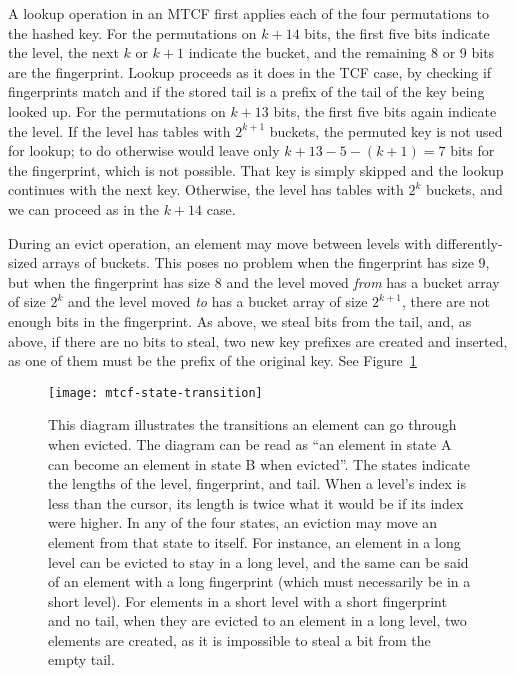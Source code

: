 \documentclass[sigconf, nonacm]{acmart}
\begin{document}
A lookup operation in an MTCF first applies each of the four permutations to the hashed key.
For the permutations on $k + 14$ bits, the first five bits indicate the level, the next $k$ or $k+1$ indicate the bucket, and the remaining 8 or 9 bits are the fingerprint.
Lookup proceeds as it does in the TCF case, by checking if fingerprints match and if the stored tail is a prefix of the tail of the key being looked up.
For the permutations on $k + 13$ bits, the first five bits again indicate the level.
If the level has tables with $2^{k+1}$ buckets, the permuted key is not used for lookup; to do otherwise would leave only $k+13 - 5 - (k+1) = 7$ bits for the fingerprint, which is not possible.
That key is simply skipped and the lookup continues with the next key. %
Otherwise, the level has tables with $2^k$ buckets, and we can proceed as in the $k+14$ case.


During an evict operation, an element may move between levels with differently-sized arrays of buckets.
This poses no problem when the fingerprint has size 9, but when the fingerprint has size 8 and the level moved {\em from} has a bucket array of size $2^k$ and the level moved {\em to} has a bucket array of size $2^{k+1}$, there are not enough bits in the fingerprint.
As above, we steal bits from the tail, and, as above, if there are no bits to steal, two new key prefixes are created and inserted, as one of them must be the prefix of the original key.
See Figure~\ref{mtcf-state-transition}

\begin{figure}
  \texttt{[image: mtcf-state-transition]}
\caption{\label{mtcf-state-transition}
This diagram illustrates the transitions an element can go through when evicted.
The diagram can be read as ``an element in state A can become an element in state B when evicted''.
The states indicate the lengths of the level, fingerprint, and tail.
When a level's index is less than the cursor, its length is twice what it would be if its index were higher.
In any of the four states, an eviction may move an element from that state to itself.
For instance, an element in a long level can be evicted to stay in a long level, and the same can be said of an element with a long fingerprint (which must necessarily be in a short level).
For elements in a short level with a short fingerprint and no tail, when they are evicted to an element in a long level, two elements are created, as it is impossible to steal a bit from the empty tail.
}
\end{figure}
\end{document}
